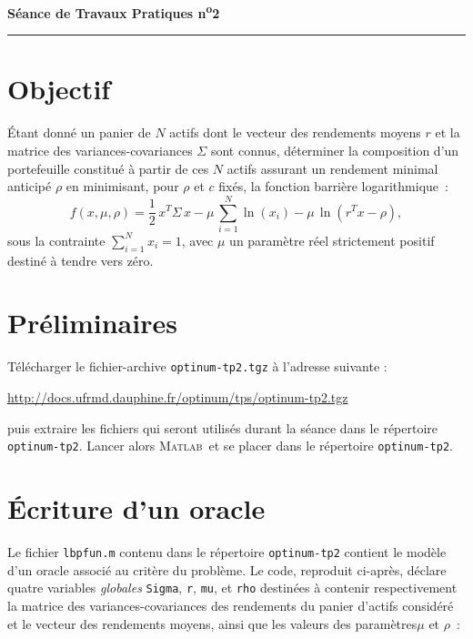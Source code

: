 \documentclass[10pt,a4paper,fleqn]{report}
\makeatletter
\def\cleardoublepage{\clearpage\if@twoside\ifodd\c@page\else\hbox{}\thispagestyle{empty}\newpage\fi\fi}
\newcommand{\matlab}{\textsc{Matlab}}
\renewcommand{\tt}{\texttt}
\makeatother
\begin{document}
\cleardoublepage



\begin{center}

\textbf{\huge S\'{e}ance de Travaux Pratiques  n\textsuperscript{o}2}

\smallskip

\rule{10cm}{0.4pt}

\end{center}


\section*{Objectif}
\'Etant donn\'e un panier de $N$ actifs dont le vecteur des rendements moyens $r$ et la matrice des variances-covariances $\Sigma$ sont connus, d\'eterminer la composition d'un portefeuille constitu\'e \`a partir de ces $N$ actifs assurant un rendement minimal anticip\'e $\rho$ en minimisant, pour $\rho$ et $c$ fix\'es, la fonction barri\`ere logarithmique~:
\[
f(x,\mu,\rho)=\frac{1}{2}\,x^T\Sigma\,x-\mu\,\sum_{i=1}^N\ln(x_i)-\mu\,\ln\left(r^Tx-\rho\right),
\]
sous la contrainte $\sum_{i=1}^N x_i=1$, avec $\mu$ un param\`etre r\'eel strictement positif destin\'e \`a tendre vers z\'ero.


\section{Pr\'{e}liminaires}
T\'{e}l\'{e}charger le fichier-archive \tt{optinum-tp2.tgz} \`{a} l'adresse suivante :

\centerline{\url{http://docs.ufrmd.dauphine.fr/optinum/tps/optinum-tp2.tgz}}
puis extraire les fichiers qui seront utilis\'{e}s durant la s\'{e}ance dans le r\'{e}pertoire
\tt{optinum-tp2}. Lancer alors \matlab\ et se placer dans le r\'{e}pertoire \tt{optinum-tp2}.

\section{\'Ecriture d'un oracle}

Le fichier \texttt{lbpfun.m} contenu dans le répertoire \tt{optinum-tp2} contient le modèle d'un oracle associé au critère du problème. Le code, reproduit ci-après,  déclare quatre variables \textit{globales} \tt{Sigma}, \tt r, \tt{mu}, et \tt{rho} destin\'ees \`a contenir respectivement la matrice des variances-covariances des rendements du panier d'actifs consid\'er\'e et le vecteur des rendements moyens, ainsi que les valeurs des paramètres$\mu$ et $\rho$~:
\end{document}
